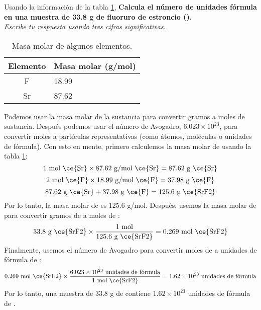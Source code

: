 Usando la información de la tabla \ref{tab:q006},
\textbf{Calcula el número de unidades fórmula en una muestra de 33.8 g de fluoruro de estroncio ().}\\
\emph{Escribe tu respuesta usando tres cifras significativas.}

\begin{multicols}{2}
    \begin{table}[H]
        \centering
        \caption{Masa molar de algunos elementos.}
        \label{tab:q006}
        \begin{tabular}{c|p{2.2cm}}
            \textbf{Elemento} & \textbf{Masa molar (g/mol)} \\\midrule
            F                 & 18.99                       \\\hline
            Sr                & 87.62                       \\\hline
            \bottomrule
        \end{tabular}
    \end{table}

    \columnbreak

    \begin{solutionbox}{7cm}
        Podemos usar la masa molar de la sustancia para convertir gramos a moles de sustancia. Después podemos usar el número de Avogadro, $6.023\times 10^{23}$, para convertir moles a partículas representativas (como átomos, moléculas o unidades de fórmula).
        Con esto en mente, primero calculemos la masa molar de  usando la tabla \ref{tab:q006}:
        \[ 1 \text{ mol \ce{Sr}} \times 87.62 \text{ g/mol \ce{Sr}} = 87.62 \text{ g \ce{Sr}} \]
        \[ 2 \text{ mol \ce{F}} \times 18.99 \text{ g/mol \ce{F}} = 37.98 \text{ g \ce{F}} \]
        \[ 87.62 \text{ g \ce{Sr}} + 37.98 \text{ g \ce{F}} = 125.6 \text{ g \ce{SrF2}} \]
        Por lo tanto, la masa molar de  es 125.6 g/mol.
        Después, usemos la masa molar de  para convertir gramos de  a moles de :
        \[33.8 \text{ g \ce{SrF2}} \times \frac{1 \text{ mol}}{125.6 \text{ g \ce{SrF2}}} = 0.269 \text{ mol \ce{SrF2}} \]
        Finalmente, usemos el número de Avogadro para convertir moles de  a unidades de fórmula de :
        \[0.269 \text{ mol \ce{SrF2}} \times \frac{6.023 \times 10^{23} \text{ unidades de fórmula}}{1 \text{ mol \ce{SrF2}}} = 1.62 \times 10^{23} \text{ unidades de fórmula} \]
        Por lo tanto, una muestra de 33.8 g de  contiene $1.62 \times 10^{23}$ unidades de fórmula de .
    \end{solutionbox}
\end{multicols}
